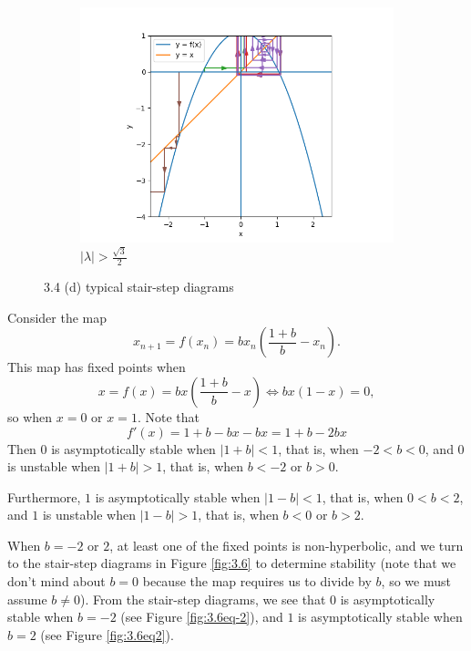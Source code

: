 \documentclass[nonumber]{homework}
\begin{document}
\begin{figure}[h]
\begin{subfigure}{.33\textwidth}
			\label{fig:3.4deq}
		\end{subfigure}
		\begin{subfigure}{.33\textwidth}
			\centering
			\includegraphics[width=\linewidth]{3.4d lambda gt sqrt(3)2.png}
			\caption{$|\lambda| > \frac{\sqrt{3}}{2}$}
			\label{fig:3.4dgt}
		\end{subfigure}
		\caption{3.4 (d) typical stair-step diagrams}
		\label{fig:3.4d}
	\end{figure}
	
	\newpage
	
	
	Consider the map
	\begin{equation*}
		x_{n+1} = f(x_n) = bx_n\left(\frac{1+b}{b} - x_n\right).
	\end{equation*}
	This map has fixed points when
	\begin{equation*}
		x = f(x) = bx\left(\frac{1+b}{b} - x\right) \iff bx(1-x) = 0,
	\end{equation*}
	so when $x = 0$ or $x = 1$. Note that
	\begin{equation*}
		f'(x) = 1+b - bx -bx = 1 + b - 2bx
	\end{equation*}
	Then $0$ is asymptotically stable when $|1+b| < 1$, that is, when $-2 < b < 0$, and $0$ is unstable when $|1+b| > 1$, that is, when $b < -2$ or $b > 0$.
	
	Furthermore, $1$ is asymptotically stable when $|1-b| < 1$, that is, when $0 < b < 2$, and $1$ is unstable when $|1-b|> 1$, that is, when $b < 0$ or $b > 2$.
	
	When $b = -2$ or $2$, at least one of the fixed points is non-hyperbolic, and we turn to the stair-step diagrams in Figure \ref{fig:3.6} to determine stability (note that we don't mind about $b=0$ because the map requires us to divide by $b$, so we must assume $b\ne0$). From the stair-step diagrams, we see that $0$ is asymptotically stable when $b = -2$ (see Figure \ref{fig:3.6eq-2}), and $1$ is asymptotically stable when $b = 2$ (see Figure \ref{fig:3.6eq2}).
	
\end{document}
